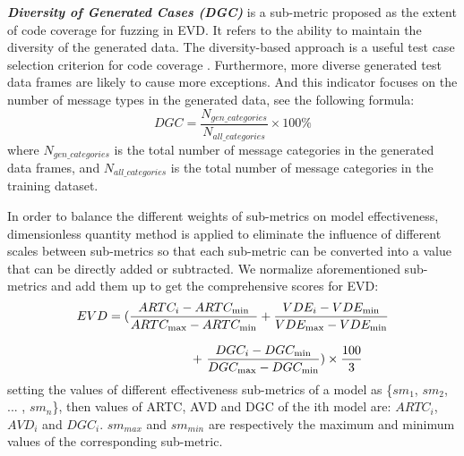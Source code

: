 \textit{\textbf{Diversity of Generated Cases (DGC)}} is a sub-metric proposed as the extent of code coverage for fuzzing in EVD. It refers to the ability to maintain the diversity of the generated data. The diversity-based approach is a useful test case selection criterion for code coverage \cite{hemmati2013achieving} \cite{mondal2015exploring}. Furthermore, more diverse generated test data frames are likely to cause more exceptions. And this indicator focuses on the number of message types in the generated data, see the following formula: 
\begin{equation}
DGC = \frac{{N_{gen\_categories}}}{{N_{all\_categories}}} \times 100\% 
\end{equation}
where $N_{gen\_categories}$ is the total number of message categories in the generated data frames, and $N_{all\_categories}$ is the total number of message categories in the training dataset.

In order to balance the different weights of sub-metrics on model effectiveness, dimensionless quantity method is applied to eliminate the influence of different scales between sub-metrics so that each sub-metric can be converted into a value that can be directly added or subtracted. We normalize aforementioned sub-metrics and add them up to get the comprehensive scores for EVD:
\begin{equation}
\begin{array}{l}
EVD=(\displaystyle\frac{{ART{C_i} - ART{C_{\min }}}}{{ART{C_{\max }} - ART{C_{\min }}}} + \frac{{VD{E_i} - VD{E_{\min }}}}{{VD{E_{\max }} - VD{{E}_{\min }}}}\\
\\{\kern 1pt} {\kern 1pt} {\kern 1pt} {\kern 1pt} {\kern 1pt} {\kern 1pt} {\kern 1pt} {\kern 1pt} {\kern 1pt} {\kern 1pt} {\kern 1pt} {\kern 1pt} {\kern 1pt} {\kern 1pt} {\kern 1pt} {\kern 1pt} {\kern 1pt} {\kern 1pt} {\kern 1pt} {\kern 1pt} {\kern 1pt} {\kern 1pt} {\kern 1pt} {\kern 1pt} {\kern 1pt} {\kern 1pt} {\kern 1pt} {\kern 1pt} {\kern 1pt} {\kern 1pt} {\kern 1pt} {\kern 1pt} {\kern 1pt} {\kern 1pt} {\kern 1pt} {\kern 1pt} {\kern 1pt} {\kern 1pt} {\kern 1pt} {\kern 1pt} {\kern 1pt} {\kern 1pt} {\kern 1pt} {\kern 1pt} {\kern 1pt} {\kern 1pt} {\kern 1pt} {\kern 1pt} {\kern 1pt} {\kern 1pt} {\kern 1pt} {\kern 1pt} {\kern 1pt} {\kern 1pt} {\kern 1pt} {\kern 1pt} {\kern 1pt} {\kern 1pt} {\kern 1pt} {\kern 1pt} {\kern 1pt} {\kern 1pt} {\kern 1pt} {\kern 1pt} {\kern 1pt} {\kern 1pt} {\kern 1pt} {\kern 1pt} {\kern 1pt} {\kern 1pt} {\kern 1pt} {\kern 1pt} {\kern 1pt} {\kern 1pt} {\kern 1pt} {\kern 1pt} {\kern 1pt} {\kern 1pt} {\kern 1pt} {\kern 1pt} {\kern 1pt} {\kern 1pt} {\kern 1pt} {\kern 1pt} {\kern 1pt} {\kern 1pt} {\kern 1pt}  {\kern 1pt} {\kern 1pt} {\kern 1pt}  
+ {\kern 1pt} \displaystyle\frac{{DG{C_i} - DG{C_{\min }}}}{{DG{C_{\max }} - DG{C_{\min }}}}) \times \displaystyle\frac{{100}}{3}{\kern 1pt}
\end{array}
\end{equation}
setting the values of different effectiveness sub-metrics of a model as \{${{sm}_1}$, ${{sm}_2}$, ... , ${{sm}_n}$\}, then values of ARTC, AVD and DGC of the ith model are: ${ARTC_i}$, ${AVD_i}$ and ${DGC_i}$. ${{sm}_{max}}$ and ${{sm}_{min}}$ are respectively the maximum and minimum values of the corresponding sub-metric.

